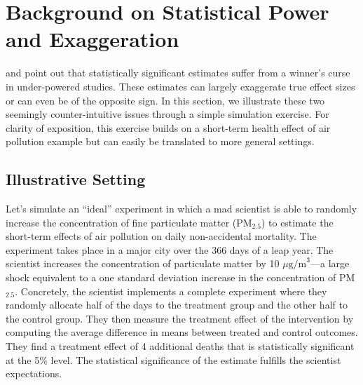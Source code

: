 \documentclass[12pt]{article}
\begin{document}



\section{Background on Statistical Power and Exaggeration}\label{section_mad_scientist}

    \cite{gelman_type_2000} and \cite{gelman_beyond_2014} point out that statistically significant estimates suffer from a winner's curse in under-powered studies. These estimates can largely exaggerate true effect sizes or can even be of the opposite sign. In this section, we illustrate these two seemingly counter-intuitive issues through a simple simulation exercise. For clarity of exposition, this exercise builds on a short-term health effect of air pollution example but can easily be translated to more general settings.

    \subsection{Illustrative Setting}

    Let's simulate an ``ideal'' experiment in which a mad scientist is able to randomly increase the concentration of fine particulate matter (PM$_{2.5}$) to estimate the short-term effects of air pollution on daily non-accidental mortality. The experiment takes place in a major city over the 366 days of a leap year. The scientist increases the concentration of particulate matter by 10 $\mu \text{g/m}^3$---a large shock equivalent to a one standard deviation increase in the concentration of PM$_{2.5}$. Concretely, the scientist implements a complete experiment where they randomly allocate half of the days to the treatment group and the other half to the control group. They then measure the treatment effect of the intervention by computing the average difference in means between treated and control outcomes. They find a treatment effect of 4 additional deaths that is statistically significant at the 5\% level. The statistical significance of the estimate fulfills the scientist expectations.
\end{document}
